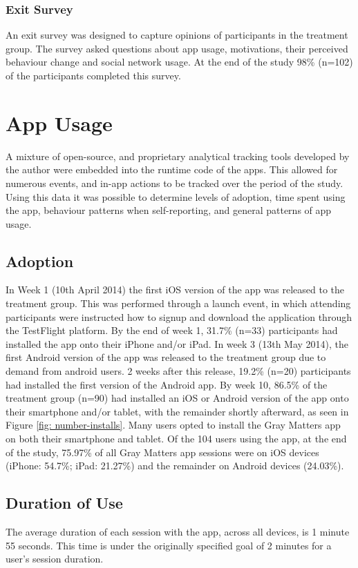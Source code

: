\subsubsection{Exit Survey}
An exit survey was designed to capture opinions of participants in the treatment group. The survey asked questions about app usage, motivations, their perceived behaviour change and social network usage. At the end of the study 98\% (n=102) of the participants completed this survey.

\section{App Usage}
A mixture of open-source, and proprietary analytical tracking tools developed by the author were embedded into the runtime code of the apps. This allowed for numerous events, and in-app actions to be tracked over the period of the study. Using this data it was possible to determine levels of adoption, time spent using the app, behaviour patterns when self-reporting, and general patterns of app usage.

\subsection{Adoption}
In Week 1 (10th April 2014) the first iOS version of the app was released to the treatment group. This was performed through a launch event, in which attending participants were instructed how to signup and download the application through the TestFlight platform. By the end of week 1, 31.7\% (n=33) participants had installed the app onto their iPhone and/or iPad. In week 3 (13th May 2014), the first Android version of the app was released to the treatment group due to demand from android users. 2 weeks after this release, 19.2\% (n=20) participants had installed the first version of the Android app. By week 10, 86.5\% of the treatment group (n=90) had installed an iOS or Android version of the app onto their smartphone and/or tablet, with the remainder shortly afterward, as seen in Figure \ref{fig: number-installs}. Many users opted to install the Gray Matters app on both their smartphone and tablet.
Of the 104 users using the app, at the end of the study, 75.97\% of all Gray Matters app sessions were on iOS devices (iPhone: 54.7\%; iPad: 21.27\%) and the remainder on Android devices (24.03\%).

\subsection{Duration of Use}
The average duration of each session with the app, across all devices, is 1 minute 55 seconds. This time is under the originally specified goal of 2 minutes for a user's session duration.

